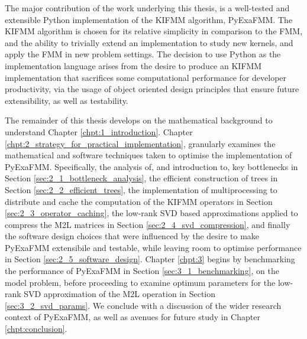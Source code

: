The major contribution of the work underlying this thesis, is a well-tested and
extensible Python implementation of the \gls{KIFMM} algorithm, \gls{PyExaFMM}. The \gls{KIFMM}
algorithm is chosen for its relative simplicity in comparison to the \gls{FMM},
and the ability to trivially extend an implementation to study new kernels, and
apply the \gls{FMM} in new problem settings. The decision to use Python as the implementation language arises from the desire
to produce an \gls{KIFMM} implementation that sacrifices some computational
performance for developer productivity, via the usage of object oriented design
principles that ensure future extensibility, as well as testability.

The remainder of this thesis develops on the mathematical background to understand Chapter
\ref{chpt:1_introduction}. Chapter \ref{chpt:2_strategy_for_practical_implementation}, granularly examines
the mathematical and software techniques taken to optimise the implementation of
\gls{PyExaFMM}. Specifically, the analysis of, and introduction to, key bottlenecks in Section \ref{sec:2_1_bottleneck_analysis},
the efficient construction of trees in Section \ref{sec:2_2_efficient_trees}, the implementation
of multiprocessing to distribute and cache the computation of the \gls{KIFMM}
operators in Section \ref{sec:2_3_operator_caching}, the low-rank SVD based
approximations applied to compress the \gls{M2L} matrices in Section \ref{sec:2_4_svd_compression},
and finally the software design choices that were influenced by the desire to
make \gls{PyExaFMM} extensibile and testable, while leaving room to optimise
performance in Section \ref{sec:2_5_software_design}. Chapter \ref{chpt:3} begins
by benchmarking the performance of \gls{PyExaFMM} in Section \ref{sec:3_1_benchmarking},
on the model problem, before proceeding to examine optimum parameters for the
low-rank SVD approximation of the \gls{M2L} operation in Section \ref{sec:3_2_svd_params}.
We conclude with a discussion of the wider research context of \gls{PyExaFMM},
as well as avenues for future study in Chapter \ref{chpt:conclusion}.

